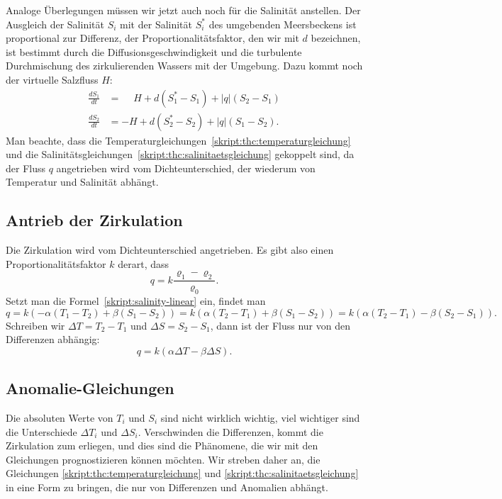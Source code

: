 Analoge Überlegungen müssen wir jetzt auch noch für die Salinität anstellen.
Der Ausgleich der Salinität $S_i$ mit der Salinität $S_i^*$ des
umgebenden Meersbeckens ist proportional zur Differenz, der
Proportionalitätsfaktor, den wir mit $d$ bezeichnen, ist bestimmt durch
die Diffusionsgeschwindigkeit und die turbulente Durchmischung des
zirkulierenden Wassers mit der Umgebung.
Dazu kommt noch der virtuelle Salzfluss $H$:
\begin{equation}
\begin{aligned}
\frac{dS_1}{dt}
&=
\phantom{-}
H
+
d(S_1^*-S_1)
+
|q|(S_2-S_1)
\\
\frac{dS_2}{dt}
&=
-H
+
d(S_2^*-S_2)
+
|q|(S_1-S_2).
\end{aligned}
\label{skript:thc:salinitaetsgleichung}
\end{equation}
Man beachte, dass die Temperaturgleichungen~\eqref{skript:thc:temperaturgleichung}
und die Salinitätsgleichungen~\eqref{skript:thc:salinitaetsgleichung} 
gekoppelt sind, da der Fluss $q$ angetrieben wird vom Dichteunterschied,
der wiederum von Temperatur und Salinität abhängt.

\subsection{Antrieb der Zirkulation}
Die Zirkulation wird vom Dichteunterschied angetrieben.
Es gibt also einen Proportionalitätsfaktor $k$ derart, dass
\[
q = k\frac{\varrho_1 - \varrho_2}{\varrho_0}.
\]
Setzt man die Formel~\eqref{skript:salinity-linear} ein, findet man
\[
q
=
k(-\alpha(T_1-T_2) + \beta(S_1-S_2))
=
k(\alpha(T_2-T_1) + \beta(S_1-S_2))
=
k(\alpha(T_2-T_1) - \beta(S_2-S_1)).
\]
Schreiben wir $\Delta T = T_2-T_1$ und $\Delta S=S_2-S_1$,
dann ist der Fluss nur von den Differenzen abhängig:
\begin{equation}
q=k(\alpha\Delta T-\beta\Delta S).
\label{skript:thc:fluss-delta}
\end{equation}

\subsection{Anomalie-Gleichungen}
Die absoluten Werte von $T_i$ und $S_i$ sind nicht wirklich wichtig,
viel wichtiger sind die Unterschiede $\Delta T_i$ und $\Delta S_i$.
Verschwinden die Differenzen, kommt die Zirkulation zum erliegen,
und dies sind die Phänomene, die wir mit den Gleichungen prognostizieren
können möchten.
Wir streben daher an, die Gleichungen
\eqref{skript:thc:temperaturgleichung}
und
\eqref{skript:thc:salinitaetsgleichung}
in eine Form zu bringen, die nur von Differenzen und Anomalien
abhängt.

